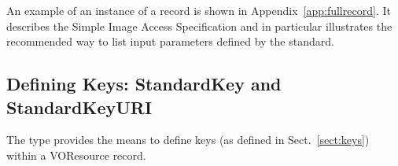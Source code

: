 \documentclass[11pt,a4paper]{ivoa}
\begin{document}
An example of an instance of a 
record is shown in Appendix~\ref{app:fullrecord}.  It describes the
Simple Image Access Specification and
in particular illustrates the recommended way to list input parameters
defined by the standard.





\subsection{Defining Keys: StandardKey and StandardKeyURI}
\label{sect:standardkeys}

The  type provides the means to
define keys (as defined in Sect.~\ref{sect:keys}) within
a VOResource record.

\end{document}
